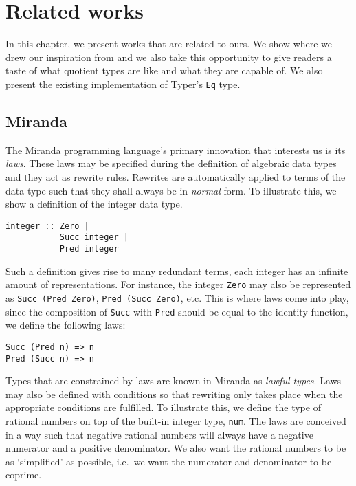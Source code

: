 \documentclass[12pt,twoside,maitrise]{dms}
\theoremstyle{definition}
\numberwithin{equation}{section}
\numberwithin{table}{chapter}
\numberwithin{figure}{chapter}
\newcommand\id[1] {\texttt{#1}}
\newcommand\fn[1] {\texttt{#1}}
\begin{document}

\chapter{Related works}

In this chapter, we present works that are related to ours. We show where we
drew our inspiration from and we also take this opportunity to give readers a
taste of what quotient types are like and what they are capable of. We also
present the existing implementation of Typer's \id{Eq} type.

\section{Miranda}

The Miranda programming language's\cite{thompson1986laws, thompson1990lawful}
primary innovation that interests us is its \emph{laws}. These laws may be
specified during the definition of algebraic data types and they act as rewrite
rules. Rewrites are automatically applied to terms of the data type such that
they shall always be in \emph{normal} form. To illustrate this, we show a
definition of the integer data type.

\begin{verbatim}
integer :: Zero |
           Succ integer |
           Pred integer
\end{verbatim}

Such a definition gives rise to many redundant terms, each integer has an
infinite amount of representations. For instance, the integer \id{Zero} may also
be represented as \fn{Succ (Pred Zero)}, \fn{Pred (Succ Zero)}, etc. This is
where laws come into play, since the composition of \id{Succ} with \id{Pred}
should be equal to the identity function, we define the following laws:

\begin{verbatim}
Succ (Pred n) => n
Pred (Succ n) => n
\end{verbatim}

Types that are constrained by laws are known in Miranda as \emph{lawful types}.
Laws may also be defined with conditions so that rewriting only takes place when
the appropriate conditions are fulfilled. To illustrate this, we define the type
of rational numbers on top of the built-in integer type, \id{num}. The laws are
conceived in a way such that negative rational numbers will always have a
negative numerator and a positive denominator. We also want the rational numbers
to be as `simplified' as possible, i.e.\ we want the numerator and denominator
to be coprime.
\end{document}
